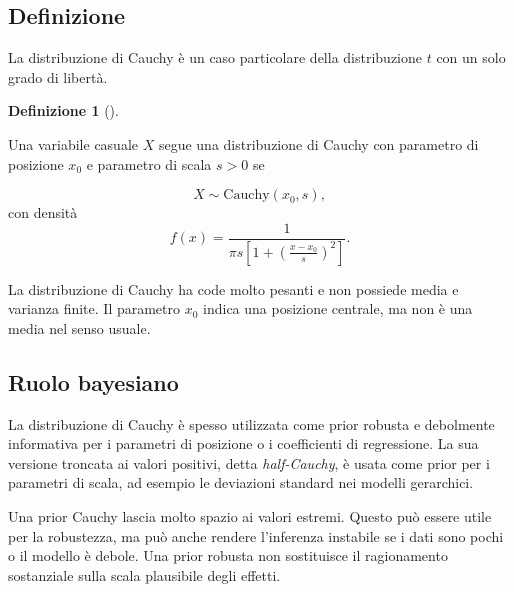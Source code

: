 \documentclass[
  italian,
  letterpaper,
  a4paper,
  11pt,
  open=any]{scrbook}
\theoremstyle{plain}
\theoremstyle{definition}
\theoremstyle{definition}
\newtheorem{definition}{Definizione}[chapter]
\theoremstyle{remark}
\begin{document}
\subsection{Definizione}\label{definizione-11}

La distribuzione di Cauchy è un caso particolare della distribuzione
\(t\) con un solo grado di libertà.

\begin{definition}[]\protect\hypertarget{def-cauchy}{}\label{def-cauchy}

Una variabile casuale \(X\) segue una distribuzione di Cauchy con
parametro di posizione \(x_0\) e parametro di scala \(s>0\) se

\[
X \sim \mathrm{Cauchy}(x_0,s),
\] con densità \[
f(x)=\frac{1}{\pi s\left[1+\left(\frac{x-x_0}{s}\right)^2\right]}.
\]

\end{definition}

La distribuzione di Cauchy ha code molto pesanti e non possiede media e
varianza finite. Il parametro \(x_0\) indica una posizione centrale, ma
non è una media nel senso usuale.

\subsection{Ruolo bayesiano}\label{ruolo-bayesiano-4}

La distribuzione di Cauchy è spesso utilizzata come prior robusta e
debolmente informativa per i parametri di posizione o i coefficienti di
regressione. La sua versione troncata ai valori positivi, detta
\emph{half-Cauchy}, è usata come prior per i parametri di scala, ad
esempio le deviazioni standard nei modelli gerarchici.

\begin{tcolorbox}[enhanced jigsaw, arc=.35mm, bottomrule=.15mm, bottomtitle=1mm, breakable, colback=white, colbacktitle=quarto-callout-warning-color!10!white, colframe=quarto-callout-warning-color-frame, coltitle=black, left=2mm, leftrule=.75mm, opacityback=0, opacitybacktitle=0.6, rightrule=.15mm, title=\textcolor{quarto-callout-warning-color}{\faExclamationTriangle}\hspace{0.5em}{Code pesanti non significa assenza di assunzioni}, titlerule=0mm, toprule=.15mm, toptitle=1mm]

Una prior Cauchy lascia molto spazio ai valori estremi. Questo può
essere utile per la robustezza, ma può anche rendere l'inferenza
instabile se i dati sono pochi o il modello è debole. Una prior robusta
non sostituisce il ragionamento sostanziale sulla scala plausibile degli
effetti.

\end{tcolorbox}
\end{document}
